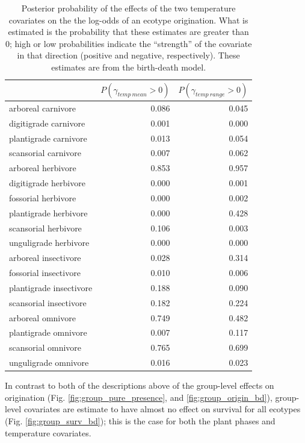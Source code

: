 \documentclass[12pt,letterpaper]{article}
\begin{document}
\begin{table}[ht]
  \centering
  \caption[Posterior probablity of effects of temperature on origination]{Posterior probability of the effects of the two temperature covariates on the the log-odds of an ecotype origination. What is estimated is the probability that these estimates are greater than 0; high or low probabilities indicate the ``strength'' of the covariate in that direction (positive and negative, respectively). These estimates are from the birth-death model.}
  \label{tab:origin_temp}
  \begin{tabular}{ l r r }
    \hline
    & \(P(\gamma_{temp\ mean} > 0)\) & \(P(\gamma_{temp\ range} > 0)\) \\ 
    \hline
    arboreal carnivore & 0.086 & 0.045 \\ 
    digitigrade carnivore & 0.001 & 0.000 \\ 
    plantigrade carnivore & 0.013 & 0.054 \\ 
    scansorial carnivore & 0.007 & 0.062 \\ 
    arboreal herbivore & 0.853 & 0.957 \\ 
    digitigrade herbivore & 0.000 & 0.001 \\ 
    fossorial herbivore & 0.000 & 0.002 \\ 
    plantigrade herbivore & 0.000 & 0.428 \\ 
    scansorial herbivore & 0.106 & 0.003 \\ 
    unguligrade herbivore & 0.000 & 0.000 \\ 
    arboreal insectivore & 0.028 & 0.314 \\ 
    fossorial insectivore & 0.010 & 0.006 \\ 
    plantigrade insectivore & 0.188 & 0.090 \\ 
    scansorial insectivore & 0.182 & 0.224 \\ 
    arboreal omnivore & 0.749 & 0.482 \\ 
    plantigrade omnivore & 0.007 & 0.117 \\ 
    scansorial omnivore & 0.765 & 0.699 \\ 
    unguligrade omnivore & 0.016 & 0.023 \\ 
    \hline
  \end{tabular}
\end{table}



In contrast to both of the descriptions above of the group-level effects on origination (Fig. \ref{fig:group_pure_presence}, and \ref{fig:group_origin_bd}), group-level covariates are estimate to have almost no effect on survival for all ecotypes (Fig. \ref{fig:group_surv_bd}); this is the case for both the plant phases and temperature covariates.
\end{document}

